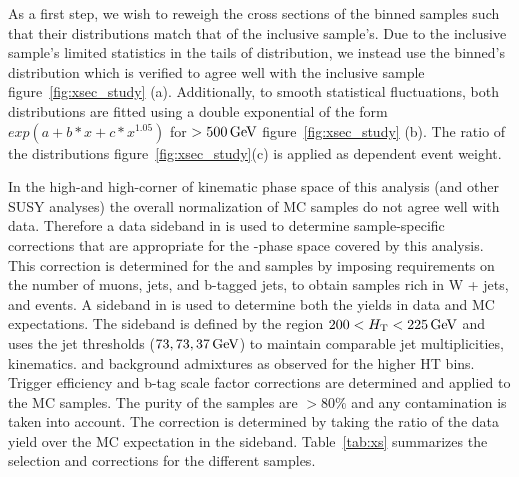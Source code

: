 
As a first step, we wish to reweigh the cross sections of the \partonht binned samples such that
their \partonht distributions match that of the inclusive sample's. Due to
the inclusive sample's limited statistics in the tails of \scalht distribution, 
we instead use the \nparton binned's \partonht distribution which is verified to agree well 
with the inclusive sample figure~\ref{fig:xsec_study} (a).  Additionally, to smooth statistical
fluctuations, both distributions are fitted using a double exponential of the form $exp(a+b*x + c*x^{1.05})$
for \scalht $> 500\,\text{Ge\hspace{-.08em}V}$ figure~\ref{fig:xsec_study} (b). The ratio of the distributions figure~\ref{fig:xsec_study}(c) 
is applied as \partonht dependent event weight.

In the high-\scalht and high-\met corner of kinematic phase space of this analysis 
(and other SUSY analyses) the overall normalization of MC samples do not 
agree well with data. Therefore a data sideband in \scalht is used
to determine sample-specific corrections that are appropriate for the
\scalht-\met phase space covered by this analysis. This correction is determined 
for the \wlnu and \ttbar samples by imposing requirements on the number of muons, 
jets, and b-tagged jets, to obtain samples rich in W + jets, and \ttbar events.
A sideband in \scalht is used to determine both the yields in data and
MC expectations. The sideband is defined by the region $200 < \mbox{$H_\text{T}$}
< 225\,\text{Ge\hspace{-.08em}V}$ and uses the jet \pt thresholds ($73,73,37\,\text{Ge\hspace{-.08em}V}$) to maintain 
comparable jet multiplicities, kinematics. and background admixtures as observed for the
higher HT bins. Trigger efficiency and b-tag scale factor corrections 
are determined and applied to the MC samples. The purity of the samples are $>80\%$ and
any contamination is taken into account. The correction is determined by 
taking the ratio of the data yield over the MC expectation in the sideband. 
Table~\ref{tab:xs} summarizes the selection and corrections for the different samples. 

